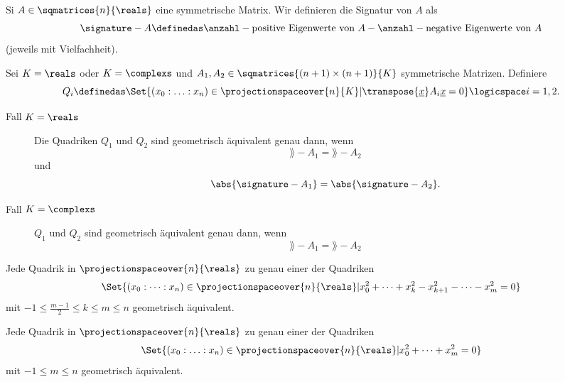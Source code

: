 \begin{deferinnerung*}
  Si \( A\in \sqmatrices{n}{\reals} \) eine symmetrische Matrix. Wir definieren die Signatur von \( A \) als
  \begin{equation}
    \begin{split}
      \signature-{A}\definedas \anzahl-{\text{positive Eigenwerte von \( A \)}}-\anzahl-{\text{negative Eigenwerte von \( A \)}}
    \end{split}
  \end{equation}
  (jeweils mit Vielfachheit).
\end{deferinnerung*}
\begin{satz}\label{klassifikation_projektive_quadriken}
  Sei \( K=\reals \) oder \( K=\complexs \) und \( A_1,A_2\in \sqmatrices{(n+1)\times (n+1)}{K} \) symmetrische Matrizen. Definiere
  \begin{equation*}
    Q_i\definedas \Set{(x_0:\dotsc:x_n)\in \projectionspaceover{n}{K}|\transpose{\underline{x}}A_i \underline{x}=0}\logicspace i=1,2.
  \end{equation*}
  \begin{description}
    \item[Fall \( K=\reals \)]
    Die Quadriken \( Q_1 \) und \( Q_2 \) sind geometrisch äquivalent genau dann, wenn
    \begin{equation*}
      \rang-{A_1}=\rang-{A_2}
    \end{equation*}
    und
    \begin{equation*}
      \abs{\signature-{A_1}}=\abs{\signature-{A_2}}.
    \end{equation*}
    \item[Fall \( K=\complexs \)]
    \( Q_1 \) und \( Q_2 \) sind geometrisch äquivalent genau dann, wenn
    \begin{equation*}
      \rang-{A_1}=\rang-{A_2}
    \end{equation*}
  \end{description}
\end{satz}
\begin{korollar}
  Jede Quadrik in \( \projectionspaceover{n}{\reals} \) zu genau einer der Quadriken
  \begin{equation*}
    \Set{(x_0:\dotsb:x_n)\in \projectionspaceover{n}{\reals}|x_0^2+\dotsb+x_k^2-x_{k+1}^2-\dotsb-x_m^2=0}
  \end{equation*}
  mit \( -1\leq \frac{m-1}{2}\leq k\leq m\leq n \) geometrisch äquivalent.

  Jede Quadrik in \( \projectionspaceover{n}{\reals} \) zu genau einer der Quadriken
  \begin{equation*}
    \Set{(x_0:\dotsc:x_n)\in \projectionspaceover{n}{\reals}|x_0^2+\dotsb+x_m^2=0}
  \end{equation*}
  mit \( -1\leq m\leq n \) geometrisch äquivalent.
\end{korollar}
